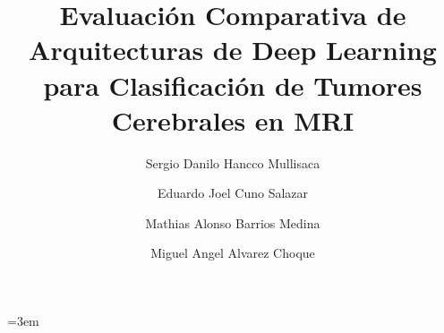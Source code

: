 \documentclass[5p]{elsarticle}
\begin{document}
\emergencystretch=3em

\begin{frontmatter}







\title{Evaluación Comparativa de Arquitecturas de Deep Learning para Clasificación de Tumores Cerebrales en MRI}



\author[First]{Sergio Danilo Hancco Mullisaca}

\author[First]{Eduardo Joel Cuno Salazar}

\author[First]{Mathias Alonso Barrios Medina}

\author[First]{Miguel Angel Alvarez Choque}


\address[First]{Universidad Nacional de San Agust{\'i}n, Arequipa, Per{\'u}.}


\end{frontmatter}
\end{document}
